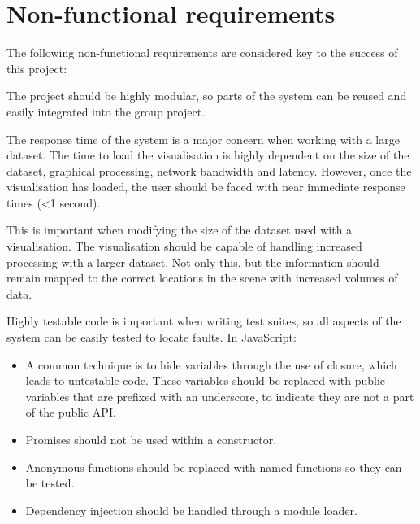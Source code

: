 \section{Non-functional requirements} {
\label{sec:non_functiona_requirements}

	The following non-functional requirements are considered key to the success of this project:

	\begin{description}[leftmargin=0pt]
		\item[Modularity:] The project should be highly modular, so parts of the system can be reused and easily integrated into the group project.
		\item[Performance:] The response time of the system is a major concern when working with a large dataset. The time to load the visualisation is highly dependent on the size of the dataset, graphical processing, network bandwidth and latency. However, once the visualisation has loaded, the user should be faced with near immediate response times (\textless 1 second).
		\item[Scalability:] This is important when modifying the size of the dataset used with a visualisation. The visualisation should be capable of handling increased processing with a larger dataset. Not only this, but the information should remain mapped to the correct locations in the scene with increased volumes of data.
		\item[Testability:] Highly testable code is important when writing test suites, so all aspects of the system can be easily tested to locate faults. In JavaScript:
			\begin{itemize}
				\item A common technique is to hide variables through the use of closure, which leads to untestable code. These variables should be replaced with public variables that are prefixed with an underscore, to indicate they are not a part of the public API.
				\item Promises should not be used within a constructor.
				\item Anonymous functions should be replaced with named functions so they can be tested.
				\item Dependency injection should be handled through a module loader.
			\end{itemize}
	\end{description}

}

